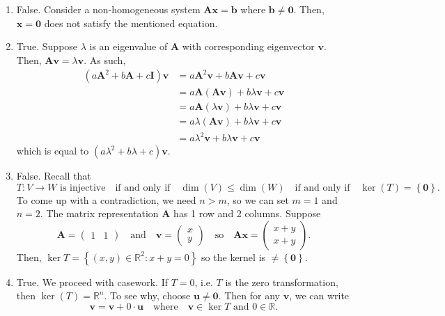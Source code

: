 \documentclass[12pt]{article}
\begin{document}
\begin{enumerate}[label=\textbf{(\alph*)}]
    \itemsep 0em
    \item False. Consider a non-homogeneous system $\mathbf{Ax}=\mathbf{b}$ where $\mathbf{b}\ne \mathbf{0}$. Then, $\mathbf{x}=\mathbf{0}$ does not satisfy the mentioned equation.
    \item True. Suppose $\lambda$ is an eigenvalue of $\mathbf{A}$ with corresponding eigenvector $\mathbf{v}$. Then, $\mathbf{Av}=\lambda\mathbf{v}$. As such, \begin{align*}
        \left(a\mathbf{A}^2 + b\mathbf{A} + c\mathbf{I}\right)\mathbf{v}&=a\mathbf{A}^2\mathbf{v}+b\mathbf{Av}+c\mathbf{v}\\
        &=a\mathbf{A}\left(\mathbf{Av}\right)+b\lambda\mathbf{v}+c\mathbf{v}\\
        &=a\mathbf{A}\left(\lambda\mathbf{v}\right)+b\lambda\mathbf{v}+c\mathbf{v}\\
        &=a\lambda\left(\mathbf{Av}\right)+b\lambda\mathbf{v}+c\mathbf{v}\\
        &=a\lambda^2\mathbf{v}+b\lambda\mathbf{v}+c\mathbf{v}
    \end{align*}
    which is equal to $\left(a\lambda^2+b\lambda+c\right)\mathbf{v}$.
    \item False. Recall that \[T:V\to W\text{ is injective}\quad\text{if and only if}\quad \operatorname{dim}\left(V\right)\le \operatorname{dim}\left(W\right)\quad \text{if and only if}\quad \operatorname{ker}\left(T\right)=\left\{\mathbf{0}\right\}.\]
    To come up with a contradiction, we need $n>m$, so we can set $m=1$ and $n=2$. The matrix representation $\mathbf{A}$ has 1 row and 2 columns. Suppose \[\mathbf{A}=\begin{pmatrix}
        1 & 1
    \end{pmatrix}\quad\text{and}\quad \mathbf{v}=\begin{pmatrix}
        x\\y
    \end{pmatrix}\quad\text{so}\quad \mathbf{Ax}=\begin{pmatrix}
        x+y \\ x+y
    \end{pmatrix}.\]
    Then, $\operatorname{ker}T=\left\{\left(x,y\right)\in\mathbb{R}^2:x+y=0\right\}$ so the kernel is $\ne \left\{\mathbf{0}\right\}$.
    \item True. We proceed with casework. If $T=0$, i.e. $T$ is the zero transformation, then $\operatorname{ker}\left(T\right)=\mathbb{R}^n$. To see why, choose $\mathbf{u}\ne \mathbf{0}$. Then for any $\mathbf{v}$, we can write \[\mathbf{v} = \mathbf{v} + 0\cdot \mathbf{u}\quad\text{where}\quad \mathbf{v}\in\ker T\text{ and }0\in\mathbb{R}.\] 

\end{enumerate}
\end{document}
